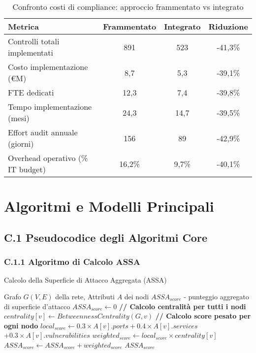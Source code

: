 \begin{table}[htbp]
\centering
\caption{Confronto costi di compliance: approccio frammentato vs integrato}
\label{tab:compliance_costs}
\begin{tabular}{lccc}
\toprule
\textbf{Metrica} & \textbf{Frammentato} & \textbf{Integrato} & \textbf{Riduzione} \\
\midrule
Controlli totali implementati & 891 & 523 & -41,3\% \\
Costo implementazione (€M) & 8,7 & 5,3 & -39,1\% \\
FTE dedicati & 12,3 & 7,4 & -39,8\% \\
Tempo implementazione (mesi) & 24,3 & 14,7 & -39,5\% \\
Effort audit annuale (giorni) & 156 & 89 & -42,9\% \\
Overhead operativo (\% IT budget) & 16,2\% & 9,7\% & -40,1\% \\
\bottomrule
\end{tabular}
\end{table}


\chapter{Algoritmi e Modelli Principali}
\label{app:algoritmi}

\section{C.1 Pseudocodice degli Algoritmi Core}

\subsection{C.1.1 Algoritmo di Calcolo ASSA}

\begin{algorithm}
\caption{Calcolo della Superficie di Attacco Aggregata (ASSA)}
\label{alg:assa}
\begin{algorithmic}[1]
\Require Grafo $G(V,E)$ della rete, Attributi $A$ dei nodi
\Ensure $ASSA_{score}$ - punteggio aggregato di superficie d'attacco
\State $ASSA_{score} \gets 0$
\State \textbf{// Calcolo centralità per tutti i nodi}
    \State $centrality[v] \gets BetweennessCentrality(G, v)$
\EndFor
\State \textbf{// Calcolo score pesato per ogni nodo}
    \State $local_{score} \gets 0.3 \times A[v].ports + 0.4 \times A[v].services$
    \State \hspace{2.3cm} $+ 0.3 \times A[v].vulnerabilities$
    \State $weighted_{score} \gets local_{score} \times centrality[v]$
    \State $ASSA_{score} \gets ASSA_{score} + weighted_{score}$
\EndFor
\State \Return $ASSA_{score}$
\end{algorithmic}
\end{algorithm}

